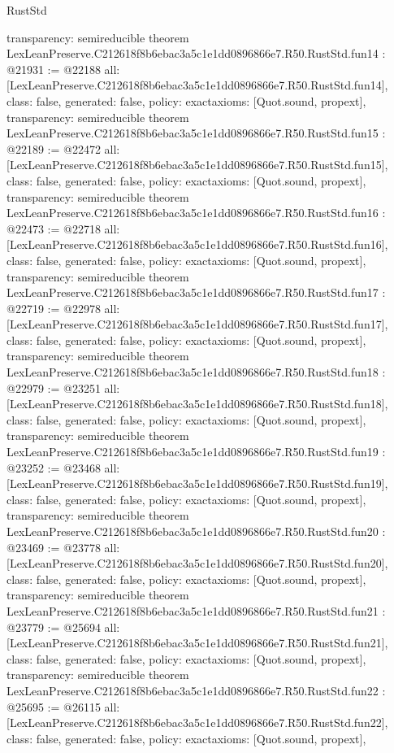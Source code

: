 \begin{lexlean}{RustStd}
\begin{coremodule}
{  transparency: semireducible
}
theorem LexLeanPreserve.C212618f8b6ebac3a5c1e1dd0896866e7.R50.RustStd.fun14 : @21931 := @22188 {
  all: [LexLeanPreserve.C212618f8b6ebac3a5c1e1dd0896866e7.R50.RustStd.fun14],
  class: false,
  generated: false,
  policy: exact{axioms: [Quot.sound, propext]},
  transparency: semireducible
}
theorem LexLeanPreserve.C212618f8b6ebac3a5c1e1dd0896866e7.R50.RustStd.fun15 : @22189 := @22472 {
  all: [LexLeanPreserve.C212618f8b6ebac3a5c1e1dd0896866e7.R50.RustStd.fun15],
  class: false,
  generated: false,
  policy: exact{axioms: [Quot.sound, propext]},
  transparency: semireducible
}
theorem LexLeanPreserve.C212618f8b6ebac3a5c1e1dd0896866e7.R50.RustStd.fun16 : @22473 := @22718 {
  all: [LexLeanPreserve.C212618f8b6ebac3a5c1e1dd0896866e7.R50.RustStd.fun16],
  class: false,
  generated: false,
  policy: exact{axioms: [Quot.sound, propext]},
  transparency: semireducible
}
theorem LexLeanPreserve.C212618f8b6ebac3a5c1e1dd0896866e7.R50.RustStd.fun17 : @22719 := @22978 {
  all: [LexLeanPreserve.C212618f8b6ebac3a5c1e1dd0896866e7.R50.RustStd.fun17],
  class: false,
  generated: false,
  policy: exact{axioms: [Quot.sound, propext]},
  transparency: semireducible
}
theorem LexLeanPreserve.C212618f8b6ebac3a5c1e1dd0896866e7.R50.RustStd.fun18 : @22979 := @23251 {
  all: [LexLeanPreserve.C212618f8b6ebac3a5c1e1dd0896866e7.R50.RustStd.fun18],
  class: false,
  generated: false,
  policy: exact{axioms: [Quot.sound, propext]},
  transparency: semireducible
}
theorem LexLeanPreserve.C212618f8b6ebac3a5c1e1dd0896866e7.R50.RustStd.fun19 : @23252 := @23468 {
  all: [LexLeanPreserve.C212618f8b6ebac3a5c1e1dd0896866e7.R50.RustStd.fun19],
  class: false,
  generated: false,
  policy: exact{axioms: [Quot.sound, propext]},
  transparency: semireducible
}
theorem LexLeanPreserve.C212618f8b6ebac3a5c1e1dd0896866e7.R50.RustStd.fun20 : @23469 := @23778 {
  all: [LexLeanPreserve.C212618f8b6ebac3a5c1e1dd0896866e7.R50.RustStd.fun20],
  class: false,
  generated: false,
  policy: exact{axioms: [Quot.sound, propext]},
  transparency: semireducible
}
theorem LexLeanPreserve.C212618f8b6ebac3a5c1e1dd0896866e7.R50.RustStd.fun21 : @23779 := @25694 {
  all: [LexLeanPreserve.C212618f8b6ebac3a5c1e1dd0896866e7.R50.RustStd.fun21],
  class: false,
  generated: false,
  policy: exact{axioms: [Quot.sound, propext]},
  transparency: semireducible
}
theorem LexLeanPreserve.C212618f8b6ebac3a5c1e1dd0896866e7.R50.RustStd.fun22 : @25695 := @26115 {
  all: [LexLeanPreserve.C212618f8b6ebac3a5c1e1dd0896866e7.R50.RustStd.fun22],
  class: false,
  generated: false,
  policy: exact{axioms: [Quot.sound, propext]},
}
\end{coremodule}
\end{lexlean}
